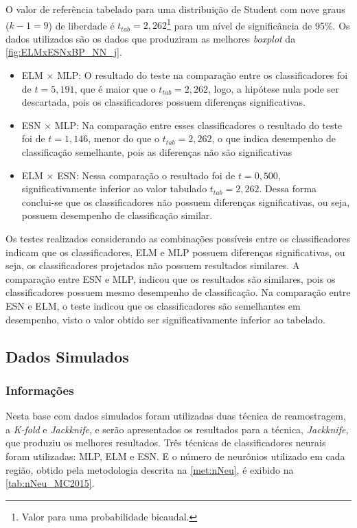 O valor de referência tabelado para uma distribuição de Student com nove graus ($k-1=9$) de liberdade é $t_{tab} = 2,262$\footnote{Valor para uma probabilidade bicaudal.} para um nível de significância de 95\%. Os dados utilizados são os dados que produziram as melhores \textit{boxplot} da \autoref{fig:ELMxESNxBP_NN_j}.  

\begin{itemize}
	\item ELM $\times$ MLP: O resultado do teste na comparação entre os classificadores foi de $t=5,191$, que é maior que o $t_{tab} = 2,262$, logo, a hipótese nula pode ser descartada, pois os classificadores possuem diferenças significativas.

	\item ESN $\times$ MLP: Na comparação entre esses classificadores o resultado do teste foi de $t=1,146$, menor do que o  $t_{tab} = 2,262$, o que indica desempenho de classificação semelhante, pois as diferenças não são significativas
	\item ELM $\times$ ESN: Nessa comparação o resultado foi de $t=	0,500$, significativamente inferior ao valor tabulado $t_{tab} = 2,262$. Dessa forma conclui-se que os classificadores não possuem diferenças significativas, ou seja, possuem desempenho de classificação similar.
\end{itemize}

Os testes realizados considerando as combinações possíveis entre os classificadores indicam que os classificadores, ELM e MLP possuem diferenças significativas, ou seja, os classificadores projetados não possuem resultados similares. A comparação entre ESN e MLP, indicou que os resultados são similares, pois os classificadores possuem mesmo desempenho de classificação. Na comparação entre ESN e ELM, o teste indicou que os classificadores são semelhantes em desempenho, visto o valor obtido ser significativamente inferior ao tabelado.
  

\subsection{Dados Simulados}
\subsubsection{Informações}
Nesta base com dados simulados foram utilizadas duas técnica de reamostragem, a  \textit{K-fold} e \textit{Jackknife}, e serão apresentados os resultados para a técnica, \textit{Jackknife}, que produziu os melhores resultados. Três técnicas de classificadores neurais foram utilizadas: MLP, ELM e ESN. E o número de neurônios utilizado em cada região, obtido pela metodologia descrita na \autoref{met:nNeu}, é exibido na \autoref{tab:nNeu_MC2015}.

